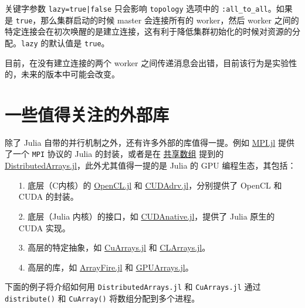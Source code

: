 关键字参数 \texttt{lazy=true|false} 只会影响 \texttt{topology} 选项中的 \texttt{:all\_to\_all}。如果是 \texttt{true}，那么集群启动的时候 master 会连接所有的 worker，然后 worker 之间的特定连接会在初次唤醒的是建立连接，这有利于降低集群初始化的时候对资源的分配。\texttt{lazy} 的默认值是 \texttt{true}。



目前，在没有建立连接的两个 worker 之间传递消息会出错，目前该行为是实验性的，未来的版本中可能会改变。



\hypertarget{739481912811734032}{}


\section{一些值得关注的外部库}



除了 Julia 自带的并行机制之外，还有许多外部的库值得一提。例如 \href{https://github.com/JuliaParallel/MPI.jl}{MPI.jl} 提供了一个 \texttt{MPI} 协议的 Julia 的封装，或者是在 \hyperlink{9426129202976203184}{共享数组} 提到的 \href{https://github.com/JuliaParallel/Distributedarrays.jl}{DistributedArrays.jl}，此外尤其值得一提的是 Julia 的 GPU 编程生态，其包括：



\begin{itemize}
\item[1. ] 底层（C内核）的 \href{https://github.com/JuliaGPU/OpenCL.jl}{OpenCL.jl} 和 \href{https://github.com/JuliaGPU/CUDAdrv.jl}{CUDAdrv.jl}，分别提供了 OpenCL 和 CUDA 的封装。


\item[2. ] 底层（Julia 内核）的接口，如 \href{https://github.com/JuliaGPU/CUDAnative.jl}{CUDAnative.jl}，提供了 Julia 原生的 CUDA 实现。


\item[3. ] 高层的特定抽象，如 \href{https://github.com/JuliaGPU/CuArrays.jl}{CuArrays.jl} 和 \href{https://github.com/JuliaGPU/CLArrays.jl}{CLArrays.jl}。


\item[4. ] 高层的库，如 \href{https://github.com/JuliaComputing/ArrayFire.jl}{ArrayFire.jl} 和 \href{https://github.com/JuliaGPU/GPUArrays.jl}{GPUArrays.jl}。

\end{itemize}


下面的例子将介绍如何用 \texttt{DistributedArrays.jl} 和 \texttt{CuArrays.jl} 通过 \texttt{distribute()} 和 \texttt{CuArray()} 将数组分配到多个进程。



